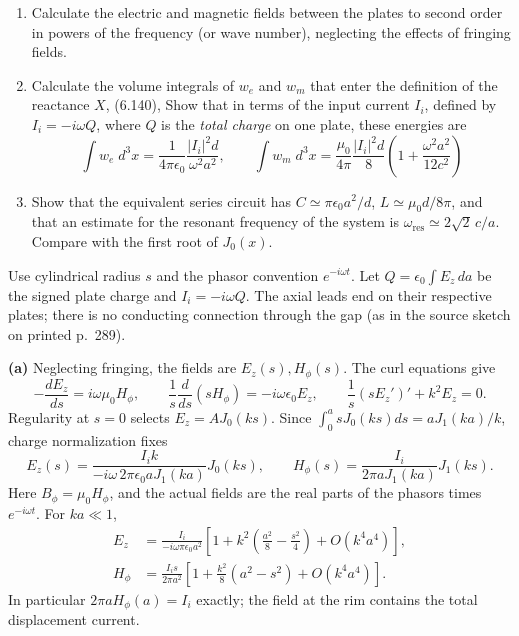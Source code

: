 \begin{enumerate}
\item[(a)] Calculate the electric and magnetic fields between the plates to second order in powers of the frequency (or wave number), neglecting the effects of fringing fields.
\item[(b)] Calculate the volume integrals of $w_{e}$ and $w_{m}$ that enter the definition of the reactance $X$, (6.140),  Show that in terms of the input current $I_{i}$, defined by $I_{i}=-i\omega Q$, where $Q$ is the \emph{total charge} on one plate, these energies are
\[
\int w_{e}\;d^{3}x=\frac{1}{4\pi\epsilon_{0}}\frac{|I_{i}|^{2}d}{\omega^{2}a^{2}},\qquad
\int w_{m}\;d^{3}x=\frac{\mu_{0}}{4\pi}\frac{|I_{i}|^{2}d}{8}\left(1+\frac{\omega^{2}a^{2}}{12c^{2}}\right)
\]
\item[(c)] Show that the equivalent series circuit has $C\simeq\pi\epsilon_{0}a^{2}/d$, $L\simeq\mu_{0}d/8\pi$, and that an estimate for the resonant frequency of the system is $\omega_{\mathrm{res}}\simeq2\sqrt{2}\,c/a$. Compare with the first root of $J_{0}(x)$.
\end{enumerate}
\solution

Use cylindrical radius $s$ and the phasor convention $e^{-i\omega t}$.
Let $Q=\epsilon_0\int E_z\,da$ be the signed plate charge and
$I_i=-i\omega Q$. The axial leads end on their respective plates; there
is no conducting connection through the gap (as in the source sketch on
printed p.~289).

\textbf{(a)} Neglecting fringing, the fields are $E_z(s),H_\phi(s)$.
The curl equations give
\[
-\frac{dE_z}{ds}=i\omega\mu_0H_\phi,\qquad
\frac1s\frac d{ds}(sH_\phi)=-i\omega\epsilon_0E_z,
\qquad \frac1s(sE_z')'+k^2E_z=0.
\]
Regularity at $s=0$ selects $E_z=A J_0(ks)$. Since
$\int_0^a sJ_0(ks)ds=aJ_1(ka)/k$, charge normalization fixes
\[
\boxed{E_z(s)=\frac{I_i k}{-i\omega\,2\pi\epsilon_0aJ_1(ka)}J_0(ks),
\qquad H_\phi(s)=\frac{I_i}{2\pi aJ_1(ka)}J_1(ks).}
\]
Here $B_\phi=\mu_0H_\phi$, and the actual fields are the real parts
of the phasors times $e^{-i\omega t}$. For $ka\ll1$,
\begin{align*}
E_z&=\frac{I_i}{-i\omega\pi\epsilon_0a^2}
\left[1+k^2\left(\frac{a^2}{8}-\frac{s^2}{4}\right)+O(k^4a^4)\right],\\
H_\phi&=\frac{I_i s}{2\pi a^2}
\left[1+\frac{k^2}{8}(a^2-s^2)+O(k^4a^4)\right].
\end{align*}
In particular $2\pi aH_\phi(a)=I_i$ exactly; the field at the rim
contains the total displacement current.

